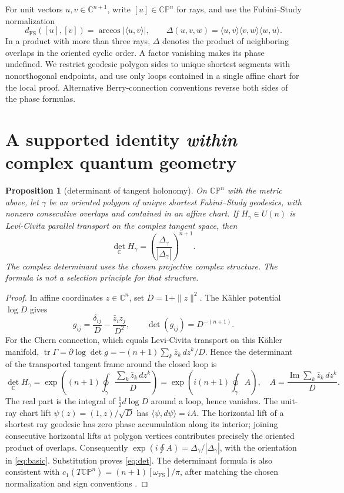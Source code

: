 \documentclass[11pt,a4paper]{article}
\newtheorem{proposition}[theorem]{Proposition}
\newcommand{\CP}{\mathbb{CP}}
\newcommand{\FS}{\mathrm{FS}}
\begin{document}
For unit vectors \(u,v\in\mathbb C^{n+1}\), write \([u]\in\CP^n\) for rays, and use the Fubini--Study normalization
\begin{equation}
 d_{\FS}([u],[v])=\arccos |\langle u,v\rangle|,
 \qquad \Delta(u,v,w)=\langle u,v\rangle\langle v,w\rangle\langle w,u\rangle .\label{eq:basic}
\end{equation}
In a product with more than three rays, \(\Delta\) denotes the product of neighboring overlaps in the oriented cyclic order. A factor vanishing makes its phase undefined. We restrict geodesic polygon sides to unique shortest segments with nonorthogonal endpoints, and use only loops contained in a single affine chart for the local proof. Alternative Berry-connection conventions reverse both sides of the phase formulas.

\section{A supported identity \emph{within} complex quantum geometry}
\begin{proposition}[determinant of tangent holonomy]\label{prop:hol}
On \(\CP^n\) with the metric above, let \(\gamma\) be an oriented polygon of unique shortest Fubini--Study geodesics, with nonzero consecutive overlaps and contained in an affine chart. If \(H_\gamma\in U(n)\) is Levi-Civita parallel transport on the \emph{complex} tangent space, then
\begin{equation}
 \det_{\mathbb C}H_\gamma=\left(\frac{\Delta_\gamma}{|\Delta_\gamma|}\right)^{n+1}.\label{eq:det}
\end{equation}
The complex determinant uses the chosen projective complex structure. The formula is not a selection principle for that structure.
\end{proposition}
\begin{proof}
In affine coordinates \(z\in\mathbb C^n\), set \(D=1+\|z\|^2\). The K\"ahler potential \(\log D\) gives
\[
 g_{i\bar j}=\frac{\delta_{ij}}D-\frac{\bar z_i z_j}{D^2},\qquad
 \det(g_{i\bar j})=D^{-(n+1)}.
\]
For the Chern connection, which equals Levi-Civita transport on this K\"ahler manifold, \(\operatorname{tr}\Gamma=\partial\log\det g=-(n+1)\sum_k\bar z_k\,dz^k/D\). Hence the determinant of the transported tangent frame around the closed loop is
\[
 \det_{\mathbb C}H_\gamma
 =\exp\left((n+1)\oint_\gamma\frac{\sum_k\bar z_k\,dz^k}{D}\right)
 =\exp\left(i(n+1)\oint_\gamma A\right),\quad
 A=\frac{\operatorname{Im}\sum_k\bar z_k\,dz^k}{D}.
\]
The real part is the integral of \(\tfrac12d\log D\) around a loop, hence vanishes. The unit-ray chart lift \(\psi(z)=(1,z)/\sqrt D\) has \(\langle\psi,d\psi\rangle=iA\). The horizontal lift of a shortest ray geodesic has zero phase accumulation along its interior; joining consecutive horizontal lifts at polygon vertices contributes precisely the oriented product of overlaps. Consequently \(\exp(i\oint A)=\Delta_\gamma/|\Delta_\gamma|\), with the orientation in \eqref{eq:basic}. Substitution proves \eqref{eq:det}. The determinant formula is also consistent with \(c_1(T\CP^n)=(n+1)[\omega_{\FS}]/\pi\), after matching the chosen normalization and sign conventions \cite{font,bengtsson}.
\end{proof}
\end{document}
